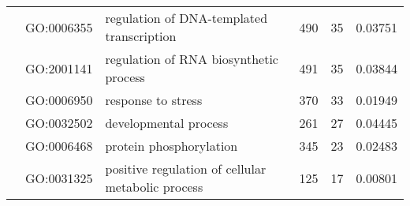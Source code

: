 \begin{landscape}
\begin{longtable}[c]{@{}lllccr@{}}
		                                               & GO:0006355                         & regulation of DNA-templated transcription                                 & 490                                                                & 35                                                                   & 0.03751                                                                                  \\
		                                               & GO:2001141                         & regulation of RNA biosynthetic process                                    & 491                                                                & 35                                                                   & 0.03844                                                                                  \\
		                                               & GO:0006950                         & response to stress                                                        & 370                                                                & 33                                                                   & 0.01949                                                                                  \\
		                                               & GO:0032502                         & developmental process                                                     & 261                                                                & 27                                                                   & 0.04445                                                                                  \\
		                                               & GO:0006468                         & protein phosphorylation                                                   & 345                                                                & 23                                                                   & 0.02483                                                                                  \\
		                                               & GO:0031325                         & positive regulation of cellular metabolic process                         & 125                                                                & 17                                                                   & 0.00801                                                                                  \\

\end{longtable}
\end{landscape}
